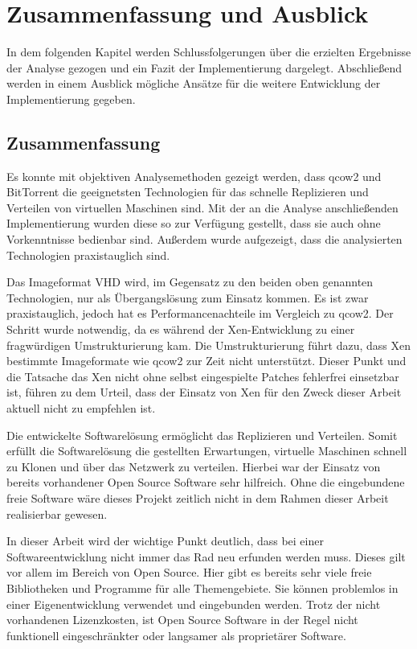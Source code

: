 \chapter{Zusammenfassung und Ausblick} 
In dem folgenden Kapitel werden Schlussfolgerungen über die erzielten Ergebnisse der Analyse gezogen und ein Fazit der Implementierung dargelegt. Abschließend werden in einem Ausblick mögliche Ansätze für die weitere Entwicklung der Implementierung gegeben.

\section{Zusammenfassung}
Es konnte mit objektiven Analysemethoden gezeigt werden, dass qcow2 und BitTorrent die geeignetsten Technologien für das schnelle Replizieren und Verteilen von virtuellen Maschinen sind. Mit der an die Analyse anschließenden Implementierung wurden diese so zur Verfügung gestellt, dass sie auch ohne Vorkenntnisse bedienbar sind. Außerdem wurde aufgezeigt, dass die analysierten Technologien praxistauglich sind.

Das Imageformat VHD wird, im Gegensatz zu den beiden oben genannten Technologien, nur als Übergangslösung zum Einsatz kommen. Es ist zwar praxistauglich, jedoch hat es Performancenachteile im Vergleich zu qcow2. Der Schritt wurde notwendig, da es während der Xen-Entwicklung zu einer fragwürdigen Umstrukturierung kam. Die Umstrukturierung führt dazu, dass Xen bestimmte Imageformate wie qcow2 zur Zeit nicht unterstützt. Dieser Punkt und die Tatsache das Xen nicht ohne selbst eingespielte Patches fehlerfrei einsetzbar ist, führen zu dem Urteil, dass der Einsatz von Xen für den Zweck dieser Arbeit aktuell nicht zu empfehlen ist.

Die entwickelte Softwarelösung ermöglicht das Replizieren und Verteilen. Somit erfüllt die Softwarelösung die gestellten Erwartungen, virtuelle Maschinen schnell zu Klonen und über das Netzwerk zu verteilen. Hierbei war der Einsatz von bereits vorhandener Open Source Software sehr hilfreich. Ohne die eingebundene freie Software wäre dieses Projekt zeitlich nicht in dem Rahmen dieser Arbeit realisierbar gewesen.

In dieser Arbeit wird der wichtige Punkt deutlich, dass bei einer Softwareentwicklung nicht immer das Rad neu erfunden werden muss. Dieses gilt vor allem im Bereich von Open Source. Hier gibt es bereits sehr viele freie Bibliotheken und Programme für alle Themengebiete. Sie können problemlos in einer Eigenentwicklung verwendet und eingebunden werden. Trotz der nicht vorhandenen Lizenzkosten, ist Open Source Software in der Regel nicht funktionell eingeschränkter oder langsamer als proprietärer Software.


